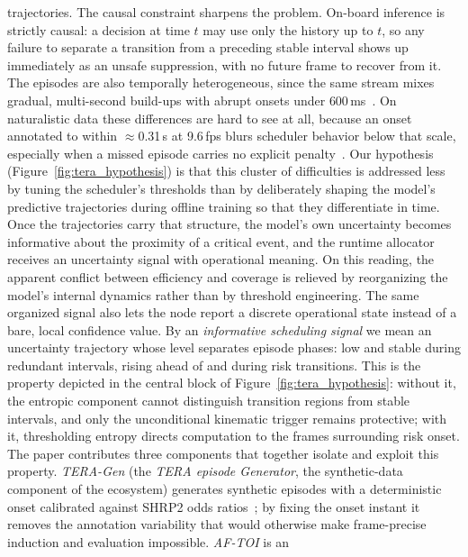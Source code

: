 \documentclass[a4paper,fleqn]{cas-dc}
\begin{document}
trajectories.
The causal constraint sharpens the problem. On-board inference is strictly causal:
a decision at time $t$ may use only the history up to $t$, so any failure to
separate a transition from a preceding stable interval shows up immediately as an
unsafe suppression, with no future frame to recover from it. The episodes are
also temporally heterogeneous, since the same stream mixes gradual, multi-second
build-ups with abrupt onsets under
$600$\,ms~\cite{dingus2016shrp2,bouhsissin2023driver}. On
naturalistic data these differences are hard to see at all, because an onset
annotated to
within $\approx$0.31\,s at 9.6\,fps blurs scheduler behavior below that scale,
especially when a missed episode carries no explicit
penalty~\cite{dingus2016shrp2,fang2022dada,ortega2020dmd}.
Our hypothesis (Figure~\ref{fig:tera_hypothesis}) is that this cluster of
difficulties is addressed less by tuning the scheduler's thresholds than by
deliberately shaping the model's predictive trajectories during offline training so
that they differentiate in time. Once the trajectories carry that structure, the model's own uncertainty becomes informative about the proximity of a critical event, and the runtime allocator receives an uncertainty signal with operational meaning. On this reading, the apparent conflict
between efficiency and coverage is relieved by reorganizing the model's internal
dynamics rather than by threshold engineering. The same organized signal also
lets the node report a discrete operational state instead of a bare, local
confidence value.
{\color{\revcolor}By an \emph{informative scheduling signal} we mean an uncertainty
trajectory whose level separates episode phases: low and stable during
redundant intervals, rising ahead of and during risk transitions. This is the
property depicted in the central block of Figure~\ref{fig:tera_hypothesis}:
without it, the entropic component cannot distinguish transition regions from
stable intervals, and only the unconditional kinematic trigger remains
protective; with it, thresholding entropy directs computation to the frames
surrounding risk onset.}
The paper contributes three components that together isolate and exploit this
property. \textit{TERA-Gen} {\color{\revcolor}(the \emph{TERA episode Generator}, the synthetic-data component of the ecosystem)} generates synthetic episodes with a deterministic
onset calibrated against SHRP2 odds ratios~\cite{dingus2016shrp2}; by fixing the
onset instant it removes the annotation variability that would otherwise make
frame-precise induction and evaluation impossible. \textit{AF-TOI} is an
\end{document}
